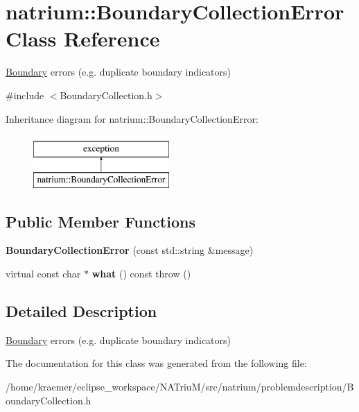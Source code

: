 \hypertarget{classnatrium_1_1BoundaryCollectionError}{\section{natrium\-:\-:Boundary\-Collection\-Error Class Reference}
\label{classnatrium_1_1BoundaryCollectionError}
}


\hyperlink{classnatrium_1_1Boundary}{Boundary} errors (e.\-g. duplicate boundary indicators)  




{\ttfamily \#include $<$Boundary\-Collection.\-h$>$}

Inheritance diagram for natrium\-:\-:Boundary\-Collection\-Error\-:\begin{figure}[H]
\begin{center}
\leavevmode
\includegraphics[height=2.000000cm]{classnatrium_1_1BoundaryCollectionError}
\end{center}
\end{figure}
\subsection*{Public Member Functions}
\begin{DoxyCompactItemize}
\item 
\hypertarget{classnatrium_1_1BoundaryCollectionError_a4eb02d034a4a61142ca0d93a633babdd}{{\bfseries Boundary\-Collection\-Error} (const std\-::string \&message)}\label{classnatrium_1_1BoundaryCollectionError_a4eb02d034a4a61142ca0d93a633babdd}

\item 
\hypertarget{classnatrium_1_1BoundaryCollectionError_ac80dc49f07da4dc6353b7d62d28a42fa}{virtual const char $\ast$ {\bfseries what} () const   throw ()}\label{classnatrium_1_1BoundaryCollectionError_ac80dc49f07da4dc6353b7d62d28a42fa}

\end{DoxyCompactItemize}


\subsection{Detailed Description}
\hyperlink{classnatrium_1_1Boundary}{Boundary} errors (e.\-g. duplicate boundary indicators) 

The documentation for this class was generated from the following file\-:\begin{DoxyCompactItemize}
\item 
/home/kraemer/eclipse\-\_\-workspace/\-N\-A\-Triu\-M/src/natrium/problemdescription/Boundary\-Collection.\-h\end{DoxyCompactItemize}
